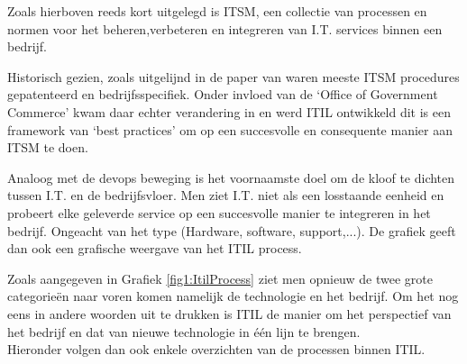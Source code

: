 \documentclass{article}
\begin{document}
	Zoals hierboven reeds kort uitgelegd is ITSM, een collectie van processen en normen voor het beheren,verbeteren en integreren van I.T. services binnen een bedrijf.\\ 
	
	\par
	\noindent
	Historisch gezien, zoals uitgelijnd in de paper van \cite{McNaughton_2010} waren meeste ITSM procedures gepatenteerd en bedrijfsspecifiek. Onder invloed van de ‘Office of Government Commerce’ kwam daar echter verandering in en werd ITIL ontwikkeld dit is een framework van ‘best practices’ om op een succesvolle en consequente manier aan ITSM te doen.\\
	
	\par
	\noindent
	Analoog met de devops beweging is het voornaamste doel om de kloof te dichten tussen I.T. en de bedrijfsvloer. Men ziet I.T. niet als een losstaande eenheid en probeert elke geleverde service op een succesvolle manier te integreren in het bedrijf. Ongeacht van het type (Hardware, software, support,...). De grafiek geeft dan ook een grafische weergave van het ITIL  process.\\
	
	\par
	\noindent
	Zoals aangegeven in Grafiek \ref{fig1:ItilProcess} ziet men opnieuw de twee grote categorieën naar voren komen namelijk de technologie en het bedrijf. Om het nog eens in andere woorden uit te drukken is ITIL de manier om het perspectief van het bedrijf en dat van nieuwe technologie in één lijn te brengen.\\
	
	\noindent
	Hieronder volgen dan ook enkele overzichten van de processen binnen ITIL.
	


	\printbibliography
\end{document}
